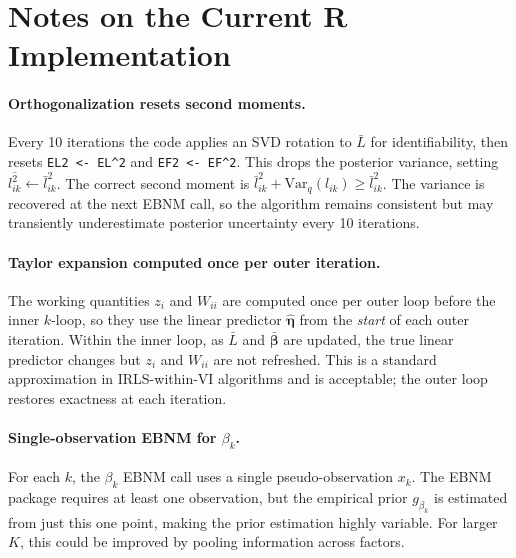 \documentclass[11pt]{article}
\newcommand{\lbar}[2]{\bar{l}_{#1#2}}
\newcommand{\lsec}[2]{\overline{l^2_{#1#2}}}
\begin{document}
\section{Notes on the Current R Implementation}\label{sec:code-notes}

\paragraph{Orthogonalization resets second moments.}
Every 10 iterations the code applies an SVD rotation to $\bar{L}$ for
identifiability, then resets \texttt{EL2 <- EL\^{}2} and
\texttt{EF2 <- EF\^{}2}.  This drops the posterior variance, setting
$\lsec{i}{k} \leftarrow \lbar{i}{k}^2$.  The correct second moment
is $\lbar{i}{k}^2 + \mathrm{Var}_q(l_{ik}) \geq \lbar{i}{k}^2$.  The variance
is recovered at the next EBNM call, so the algorithm remains consistent but
may transiently underestimate posterior uncertainty every 10 iterations.

\paragraph{Taylor expansion computed once per outer iteration.}
The working quantities $z_i$ and $W_{ii}$ are computed once per outer loop
before the inner $k$-loop, so they use the linear predictor
$\hat{\bm{\eta}}$ from the \emph{start} of each outer iteration.  Within the
inner loop, as $\bar{L}$ and $\bar{\bm{\beta}}$ are updated, the true linear
predictor changes but $z_i$ and $W_{ii}$ are not refreshed.  This is a
standard approximation in IRLS-within-VI algorithms and is acceptable; the
outer loop restores exactness at each iteration.

\paragraph{Single-observation EBNM for $\beta_k$.}
For each $k$, the $\beta_k$ EBNM call uses a single pseudo-observation
$x_k$.  The EBNM package requires at least one observation, but the
empirical prior $g_{\beta_k}$ is estimated from just this one point, making
the prior estimation highly variable.  For larger $K$, this could be
improved by pooling information across factors.
\end{document}
